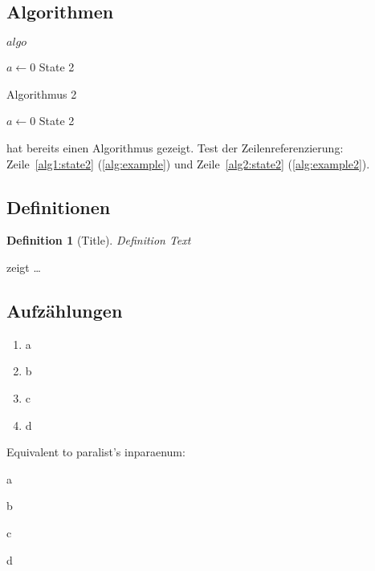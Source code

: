 \documentclass[
  numbers=noenddot,
  english,  %
  a4paper,  %
  twoside,  %
  bibliography=totoc,
  headsepline,
  cleardoublepage=empty,
  parskip=half,
  draft=false
]{scrbook}
\theoremstyle{break}
\newtheorem{definition}{Definition}[chapter]
\begin{document}
\subsection{Algorithmen}

\begin{algorithm}
  \caption{$algo$}
  \label{alg:example}
  \begin{algorithmic}[1]
    \State $a \gets 0$
    \State State 2\label{alg1:state2}
  \end{algorithmic}
\end{algorithm}

\begin{algorithm}
  \caption{Algorithmus 2}
  \label{alg:example2}
  \begin{algorithmic}[1]
    \State $a \gets 0$
    \State State 2\label{alg2:state2}
  \end{algorithmic}
\end{algorithm}

 hat bereits einen Algorithmus gezeigt.
Test der Zeilenreferenzierung: Zeile~\ref{alg1:state2} (\cref{alg:example}) und Zeile~\ref{alg2:state2} (\cref{alg:example2}).

\subsection{Definitionen}
\begin{definition}[Title]
  \label{def:def1}
  Definition Text
\end{definition}

 zeigt \ldots

\subsection{Aufzählungen}

\begin{enumerate}[label=\alph*)]
  \item a
  \item b
  \item c
  \item d
\end{enumerate}

Equivalent to paralist's inparaenum:
\begin{enumerate*}[label=\alph*)]
  \item a
  \item b
  \item c
  \item d
\end{enumerate*}
\end{document}
